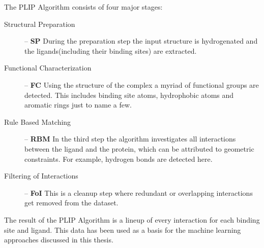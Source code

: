 The PLIP Algorithm consists of four major stages: 
\begin{description}
    \item[Structural Preparation] -- \textbf{SP} 
    \newline During the preparation step the input structure is hydrogenated and the ligands(including their binding sites) are extracted. 
    \item[Functional Characterization] -- \textbf{FC}
    \newline Using the structure of the complex a myriad of functional groups are detected. This includes binding site atoms, hydrophobic atoms and aromatic rings just to name a few.
    \item[Rule Based Matching] -- \textbf{RBM}
    \newline In the third step the algorithm investigates all interactions between the ligand and the protein, which can be attributed to geometric constraints. For example, hydrogen bonds are detected here.
    \item[Filtering of Interactions] -- \textbf{FoI}
    \newline This is a cleanup step where redundant or overlapping interactions get removed from the dataset. 
\end{description}
\newblock
The result of the PLIP Algorithm is a lineup of every interaction for each binding site and ligand\cite[]{Salentin2015}.
This data has been used as a basis for the machine learning approaches discussed in this thesis.